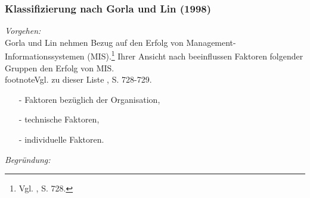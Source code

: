 \noindent
\subsubsection{Klassifizierung nach Gorla und Lin (1998)}
\textit{Vorgehen:}\\\noindent
Gorla und Lin nehmen Bezug auf den Erfolg von Management-Informationssystemen (\acs{MIS}).\footnote{Vgl. \cite{Gorla.1998}, S. 728.}
Ihrer Ansicht nach beeinflussen Faktoren folgender Gruppen den Erfolg von \ac{MIS}.\\footnote{Vgl. zu dieser Liste \cite{Gorla.1998}, S. 728-729.}
\begin{itemize}\itemsep0pt
\item[-]Faktoren bezüglich der Organisation,
\item[-]technische Faktoren,
\item[-]individuelle Faktoren.
\end{itemize}
\textit{Begründung:}\\\noindent
